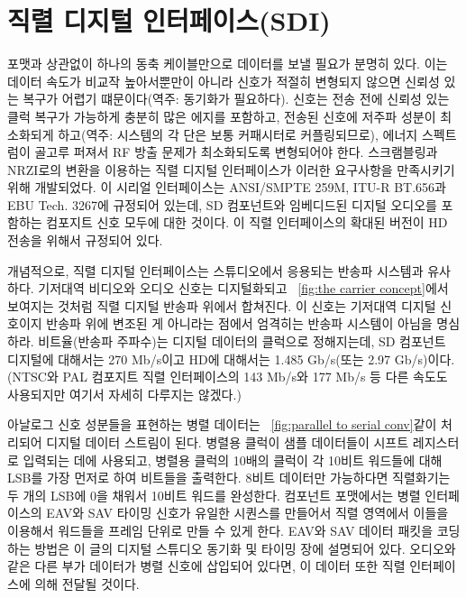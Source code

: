 \section{직렬 디지털 인터페이스(SDI)}
포맷과 상관없이 하나의 동축 케이블만으로 데이터를 보낼 필요가 분명히 있다. 이는 데이터 속도가 비교작 높아서뿐만이 아니라 신호가 적절히 변형되지 않으면 신뢰성 있는 복구가 어렵기 떄문이다(역주: 동기화가 필요하다).
신호는 전송 전에 신뢰성 있는 클럭 복구가 가능하게 충분히 많은 에지를 포함하고, 전송된 신호에 저주파 성분이 최소화되게 하고(역주: 시스템의 각 단은 보통 커패시터로 커플링되므로), 에너지 스펙트럼이 골고루 퍼져서 RF 방출 문제가 최소화되도록 변형되어야 한다.
스크램블링과 NRZI로의 변환을 이용하는 직렬 디지털 인터페이스가 이러한 요구사항을 만족시키기 위해 개발되었다. 이 시리얼 인터페이스는 ANSI/SMPTE 259M, ITU-R BT.656과 EBU Tech. 3267에 규정되어 있는데, SD 컴포넌트와 임베디드된 디지털 오디오를 포함하는 컴포지트 신호 모두에 대한 것이다.
이 직렬 인터페이스의 확대된 버전이 HD 전송을 위해서 규정되어 있다.

개념적으로, 직렬 디지털 인터페이스는 스튜디오에서 응용되는 반송파 시스템과 유사하다. 기저대역 비디오와 오디오 신호는 디지털화되고 \figurename~\ref{fig:the carrier concept}에서 보여지는 것처럼 직렬 디지털 반송파 위에서 합쳐진다.
이 신호는 기저대역 디지털 신호이지 반송파 위에 변조된 게 아니라는 점에서 엄격히는 반송파 시스템이 아님을 명심하라.
비트율(반송파 주파수)는 디지털 데이터의 클럭으로 정해지는데, SD 컴포넌트 디지털에 대해서는 270 Mb/s이고 HD에 대해서는 1.485 Gb/s(또는 2.97 Gb/s)이다. (NTSC와 PAL 컴포지트 직렬 인터페이스의 143 Mb/s와 177 Mb/s 등 다른 속도도 사용되지만 여기서 자세히 다루지는 않겠다.)

아날로그 신호 성분들을 표현하는 병렬 데이터는 \figurename~\ref{fig:parallel to serial conv}\와 같이 처리되어 디지털 데이터 스트림이 된다. 병렬용 클럭이 샘플 데이터들이 시프트 레지스터로 입력되는 데에 사용되고, 병렬용 클럭의 10배의 클럭이 각 10비트 워드들에 대해 LSB를 가장 먼저로 하여 비트들을 출력한다.
8비트 데이터만 가능하다면 직렬화기는 두 개의 LSB에 0을 채워서 10비트 워드를 완성한다. 컴포넌트 포맷에서는 병렬 인터페이스의 EAV와 SAV 타이밍 신호가 유일한 시퀀스를 만들어서 직렬 영역에서 이들을 이용해서 워드들을 프레임 단위로 만들 수 있게 한다.
EAV와 SAV 데이터 패킷을 코딩하는 방법은 이 글의 디지털 스튜디오 동기화 및 타이밍 장에 설명되어 있다. 오디오와 같은 다른 부가 데이터가 병렬 신호에 삽입되어 있다면, 이 데이터 또한 직렬 인터페이스에 의해 전달될 것이다.

